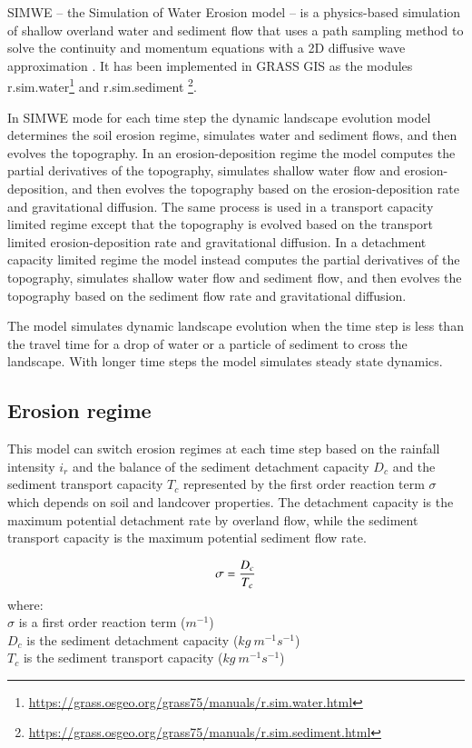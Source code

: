 \documentclass[final,3p,times,twocolumn]{elsarticle}
\begin{document}
SIMWE -- the Simulation of Water Erosion model -- 
is a physics-based simulation of shallow overland water and sediment flow
that uses a path sampling method to solve the continuity and momentum equations 
with a 2D diffusive wave approximation 
\cite{mitas1998,mitasova2001,mitasova2004}.
%
It has been implemented in GRASS GIS as the modules 
r.sim.water\footnote{\url{https://grass.osgeo.org/grass75/manuals/r.sim.water.html}} 
and r.sim.sediment \footnote{\url{https://grass.osgeo.org/grass75/manuals/r.sim.sediment.html}}.

In SIMWE mode 
for each time step
the dynamic landscape evolution model 
determines the soil erosion regime,
simulates water and sediment flows, 
and then evolves the topography. 
In an erosion-deposition regime 
the model 
computes the partial derivatives of the topography,
simulates shallow water flow and erosion-deposition,
and then evolves the topography based on the erosion-deposition rate
and gravitational diffusion.
The same process is used in
a transport capacity limited regime
except that the topography is evolved based on 
the transport limited erosion-deposition rate
and gravitational diffusion.
In a detachment capacity limited regime
the model instead
computes the partial derivatives of the topography,
simulates shallow water flow and sediment flow,
and then evolves the topography based on the sediment flow rate
and gravitational diffusion.

The model simulates dynamic landscape evolution 
when the time step is less than the travel time 
for a drop of water or a particle of sediment to cross the landscape.
With longer time steps the model simulates steady state dynamics. 

\subsection{Erosion regime}
This model can switch erosion regimes at each time step
based on the rainfall intensity $i_r$
and the balance of the sediment detachment capacity $D_c$
and the sediment transport capacity $T_c$
represented by the first order reaction term $\sigma$ 
which depends on soil and landcover properties.
The detachment capacity is the maximum potential detachment rate by overland flow, while
the sediment transport capacity is the maximum potential sediment flow rate.

\begin{equation}
\label{eq:regime}
\sigma = {D_c \over T_c}
\end{equation}
%
{\small
\noindent
where: \\
\noindent
\hspace*{0.5em} $\sigma$  is a first order reaction term ($m^{-1}$)\\
\hspace*{0.5em} $D_c$ is the sediment detachment capacity ($kg~m^{-1}s^{-1}$)\\
\hspace*{0.5em} $T_c$ is the sediment transport capacity ($kg~m^{-1}s^{-1}$)\\
}
\end{document}
